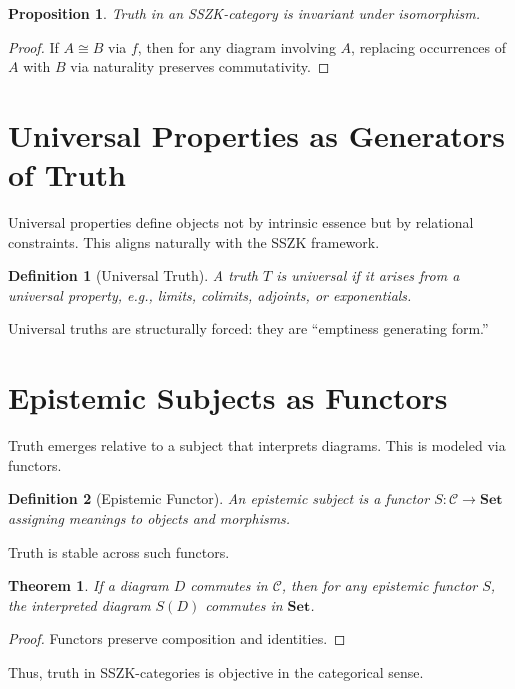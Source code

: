 \documentclass[11pt]{article}
\newtheorem{definition}{Definition}
\newtheorem{proposition}{Proposition}
\newtheorem{theorem}{Theorem}
\begin{document}
\begin{proposition}
Truth in an SSZK-category is invariant under isomorphism.
\end{proposition}

\begin{proof}
If $A \cong B$ via $f$, then for any diagram involving $A$, replacing occurrences of $A$ with $B$ via naturality preserves commutativity.
\end{proof}

\section{Universal Properties as Generators of Truth}
Universal properties define objects not by intrinsic essence but by relational constraints. This aligns naturally with the SSZK framework.

\begin{definition}[Universal Truth]
A truth $T$ is universal if it arises from a universal property, e.g., limits, colimits, adjoints, or exponentials.
\end{definition}

Universal truths are structurally forced: they are ``emptiness generating form.''

\section{Epistemic Subjects as Functors}
Truth emerges relative to a subject that interprets diagrams. This is modeled via functors.

\begin{definition}[Epistemic Functor]
An epistemic subject is a functor $S : \mathcal{C} \to \mathbf{Set}$ assigning meanings to objects and morphisms.
\end{definition}

Truth is stable across such functors.

\begin{theorem}
If a diagram $D$ commutes in $\mathcal{C}$, then for any epistemic functor $S$, the interpreted diagram $S(D)$ commutes in $\mathbf{Set}$.
\end{theorem}

\begin{proof}
Functors preserve composition and identities.
\end{proof}

Thus, truth in SSZK-categories is objective in the categorical sense.
\end{document}
